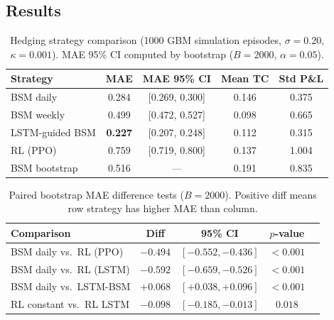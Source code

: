\documentclass[12pt,a4paper]{article}
\begin{document}
\subsection{Results}

\begin{table}[H]
  \centering
  \caption{Hedging strategy comparison (1000 GBM simulation episodes,
           $\sigma=0.20$, $\kappa=0.001$).
           MAE 95\% CI computed by bootstrap ($B=2000$, $\alpha=0.05$).}
  \label{tab:p1_main}
  \begin{tabular}{lcccc}
    \toprule
    Strategy & MAE & MAE 95\% CI & Mean TC & Std P\&L \\
    \midrule
    BSM daily          & 0.284 & [0.269, 0.300] & 0.146 & 0.375 \\
    BSM weekly         & 0.499 & [0.472, 0.527] & 0.098 & 0.665 \\
    LSTM-guided BSM    & \textbf{0.227} & [0.207, 0.248] & 0.112 & 0.315 \\
    RL (PPO)           & 0.759 & [0.719, 0.800] & 0.137 & 1.004 \\
    BSM bootstrap      & 0.516 & --- & 0.191 & 0.835 \\
    \bottomrule
  \end{tabular}
\end{table}

\begin{table}[H]
  \centering
  \caption{Paired bootstrap MAE difference tests ($B=2000$).
           Positive diff means row strategy has higher MAE than column.}
  \label{tab:p1_boot}
  \begin{tabular}{lcccc}
    \toprule
    Comparison & Diff & 95\% CI & $p$-value \\
    \midrule
    BSM daily vs.\ RL (PPO)       & $-0.494$ & $[-0.552, -0.436]$ & $<0.001$ \\
    BSM daily vs.\ RL (LSTM)      & $-0.592$ & $[-0.659, -0.526]$ & $<0.001$ \\
    BSM daily vs.\ LSTM-BSM       & $+0.068$ & $[+0.038, +0.096]$ & $<0.001$ \\
    RL constant vs.\ RL LSTM      & $-0.098$ & $[-0.185, -0.013]$ & $0.018$  \\
    \bottomrule
  \end{tabular}
\end{table}
\end{document}
